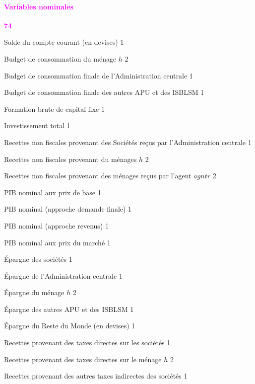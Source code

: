 \documentclass[11pt,a4paper]{article}
\newcommand{\agntr}{\mathit{agntr}}
\newcommand{\CAB}{\mathit{CAB}}
\newcommand{\CTG}{\mathit{CTG}}
\newcommand{\CTH}{\mathit{CTH}}
\newcommand{\CTNGO}{\mathit{CTNGO}}
\newcommand{\FBCF}{\mathit{FBCF}}
\newcommand{\IT}{\mathit{IT}}
\newcommand{\NTXF}{\mathit{NTXF}}
\newcommand{\NTXH}{\mathit{NTXH}}
\newcommand{\NTXHH}{\mathit{NTXHH}}
\newcommand{\PIB}{\mathit{PIB}}
\newcommand{\SF}{\mathit{SF}}
\newcommand{\SG}{\mathit{SG}}
\newcommand{\SH}{\mathit{SH}}
\newcommand{\SNG}{\mathit{SNG}}
\newcommand{\SROW}{\mathit{SROW}}
\newcommand{\TDF}{\mathit{TDF}}
\newcommand{\TDH}{\mathit{TDH}}
\newcommand{\TIF}{\mathit{TIF}}
\newcommand{\redparagraph}[1]{\paragraph*{\large\textcolor{Fuchsia}{#1}}}
\begin{document}
	\redparagraph{Variables nominales}\hfill \textcolor{Fuchsia}{\textbf{74}} 
	\begin{description}[leftmargin=!,labelwidth=\widthof{\bfseries AAAAAAAA},parsep=9.7pt]	
		\item[$\CAB$]	Solde du compte courant (en devises)				\hfill 1
		\item[$\CTH_h$]	Budget de consommation du ménage $h$ 	\hfill 2
		\item[$\CTG$]	Budget de consommation finale de l'Administration centrale	\hfill 1
		\item[$\CTNGO$]	Budget de consommation finale des autres APU et des ISBLSM	\hfill 1
		\item[$\FBCF$]	Formation brute de capital fixe 		\hfill 1%
		\item[$\IT$]	Investissement total 								\hfill 1
		\item[$\NTXF$]   Recettes non fiscales provenant des Sociétés reçus par l'Administration centrale \hfill 1
		\item[$\NTXH_h$]  Recettes non fiscales provenant du ménages $h$ \hfill 2
		\item[$\NTXHH_{\agntr}$] Recettes non fiscales provenant des ménages reçus par l'agent $\agntr$ \hfill 2
		\item[$\PIB^{\mathit{BP}}$]	PIB nominal aux prix de base			\hfill 1
		\item[$\PIB^{\mathit{FD}}$]	PIB nominal (approche demande finale)	\hfill 1
		\item[$\PIB^{\mathit{IB}}$]	PIB nominal (approche revenus)			\hfill 1
		\item[$\PIB^{\mathit{MP}}$]	PIB nominal aux prix du marché			\hfill 1%
		\item[$\SF$]	Épargne des sociétés 					\hfill 1
		\item[$\SG$]	Épargne de l'Administration centrale 	\hfill 1
		\item[$\SH_h$]	Épargne du ménage $h$ 					\hfill 2
		\item[$\SNG$]	Épargne des autres APU et des ISBLSM 	\hfill 1
		\item[$\SROW$]  Épargne du Reste du Monde (en devises) 				\hfill 1%
		\item[$\TDF$]	Recettes provenant des taxes directes sur les sociétés 				\hfill 1
		\item[$\TDH_h$]	Recettes provenant des taxes directes sur le ménage $h$ 			\hfill 2
		\item[$\TIF$]	Recettes provenant des autres taxes indirectes des sociétés 		\hfill 1

\end{description}
\end{document}
